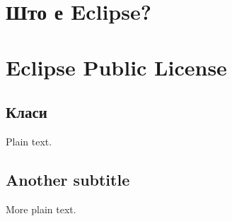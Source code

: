 




\section{Што е Eclipse?}

\section{Eclipse Public License}


\subsection{Класи}

Plain text.

\subsection{Another subtitle}

More plain text.



